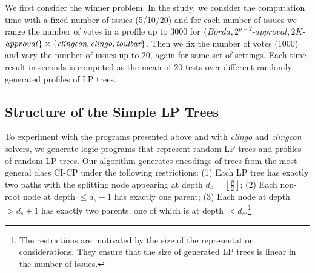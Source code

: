 We first consider the winner problem. In the study, we consider the 
computation time with a fixed number of issues (5/10/20) and for each number of issues we range 
the number of votes in a profile up to 3000 for $\{Borda, 2^{p-2}$-$approval, 
2K$-$approval\} \times \{\textit{clingcon}, \textit{clingo}, \textit{toulbar}\}$.  
Then we fix the number of votes (1000) and vary the number of issues up to 20, again for 
same set of settings.  Each time 
result in seconds 
is computed as the mean of 20 tests over different randomly generated profiles of 
LP trees.

\subsection{Structure of the Simple LP Trees}
To experiment with the programs presented above and with \emph{clingo} and
\emph{clingcon} solvers, we generate logic programs that represent 
random LP trees and profiles of random
LP trees.
Our algorithm generates encodings of trees from the most general class CI-CP 
under the following restrictions:
(1) Each LP tree has exactly two paths with the splitting node appearing 
at depth $d_s=\left \lfloor \frac{p}{2} \right \rfloor$;
(2) Each non-root node at depth $\leq d_s+1$ has exactly one parent;
(3) Each 
node at depth $> d_s+1$ has exactly two parents, one of which 
is at depth $< d_s$.\footnote{
The restrictions are motivated by the size of the representation
considerations. They ensure that the size of generated LP trees is 
linear in the number of issues.}

